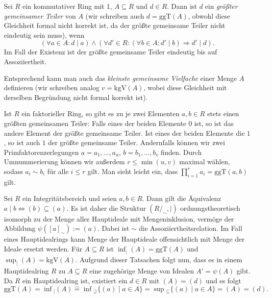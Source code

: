 \begin{definition}
    Sei $R$ ein kommutativer Ring mit 1, $A \subseteq R$ und $d \in R$. Dann ist $d$ ein \emph{größter gemeinsamer Teiler} von $A$ (wir schreiben auch $d = \mathrm{ggT}(A)$, obwohl diese Gleichheit formal nicht korrekt ist, da der größte gemeinsame Teiler nicht eindeutig sein muss), wenn
    $$ (\forall a \in A: d \mid a ) \land ( \forall d' \in R : ( \forall b \in A: d' \mid b ) \Rightarrow d' \mid d  ). $$
    Im Fall der Existenz ist der größte gemeinsame Teiler eindeutig bis auf Assoziiertheit.

    Entsprechend kann man auch das \emph{kleinste gemeinsame Vielfache} einer Menge $A$ definieren (wir schreiben  analog $v=\mathrm{kgV}(A)$, wobei diese Gleichheit mit derselben Begründung nicht formal korrekt ist).
\end{definition}

\begin{remark}
    Ist $R$ ein faktorieller Ring, so gibt es zu je zwei Elementen $a,b\in R$ stets einen größten gemeinsamen Teiler: Falls eines der beiden Elemente $0$ ist, so ist das andere Element der größte gemeinsame Teiler. Ist eines der beiden Elemente die $1$, so ist auch $1$ der größte gemeinsame Teiler. Andernfalls können wir zwei Primfaktorenzerlegungen $a=a_1,\ldots,a_u$, $b=b_1,\ldots,b_v$ finden. Durch Umnummerierung können wir außerdem $r\le\min(u,v)$ maximal wählen, sodass $a_i\sim b_i$ für alle $i\leq r$ gilt. Man sieht leicht ein, dass $\prod_{i=1}^ra_i=\mathrm{ggT}(a,b)$ gilt.
\end{remark}


\begin{remark}
    Sei $R$ ein Integritätsbereich und seien $a,b\in R$. Dann gilt die Äquivalenz
    $a\mid b\Leftrightarrow (b)\subseteq (a)$. Es ist daher die Struktur
    $(R/_\sim,\mid)$ ordnungstheoretisch isomorph zu der Menge aller Hauptideale mit Mengeninklusion,
    vermöge der Abbildung $\psi([a]_\sim):= (a)$. Dabei ist $\sim$ die Assoziiertheitsrelation. Im Fall eines
    Hauptidealrings kann \glqq Menge der Hauptideale\grqq{} offensichtlich mit \glqq Menge der Ideale\grqq{}
    ersetzt werden. Für $A\subseteq R$ ist $\inf_{\vert}(A)=\mathrm{ggT}(A)$ und $\sup_{\vert}(A)=\mathrm{kgV}(A)$.
    Aufgrund dieser Tatsachen folgt nun, dass es in einem Hauptidealring $R$
    zu $A\subseteq R$ eine zugehörige Menge von Idealen $A'=\psi(A)$ gibt. Da $R$ ein Hauptidealring ist,
    existiert ein $d\in R$ mit $(A)=(d)$ und es folgt
    $$\mathrm{ggT}(A)=\inf{}_|(A)\widehat{=}\inf{}_{\supseteq}\{(a)\mid a\in A\}=\sup{}_\subseteq\{(a)\mid a\in A\}=(A)=(d).$$
\end{remark}

